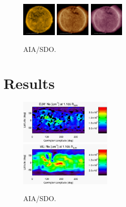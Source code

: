\documentclass[baaa]{baaa}
\begin{document}
\begin{figure}
  \centering
  \includegraphics[width=0.15\textwidth]{figures/img_171.pdf}
  \includegraphics[width=0.15\textwidth]{figures/img_193.pdf}
  \includegraphics[width=0.15\textwidth]{figures/img_211.pdf}
  \caption{AIA/SDO.}
  \label{fig_00}
\end{figure}


\section{Results}

\begin{figure}
  \centering
  \includegraphics[width=0.4\textwidth]{figures/map_ne_aia.eps}\\
  \includegraphics[width=0.4\textwidth]{figures/map_ne_kcor.eps}
  \caption{AIA/SDO.}
  \label{fig_maps}
\end{figure}
\end{document}
